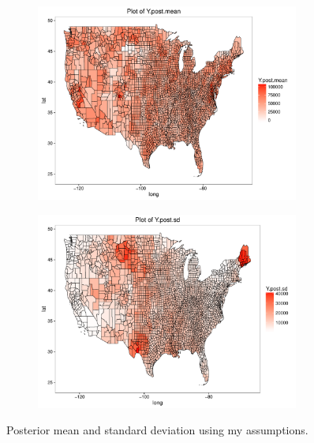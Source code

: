 \documentclass[10pt]{article}
\begin{document}
\begin{figure}
\centering
\begin{subfigure}[b]{.95\textwidth}
  \centering
  \includegraphics[width=0.95\textwidth]{post-mean.pdf}
  \label{fig:post-mean}
\end{subfigure}

\begin{subfigure}[b]{.95\textwidth}
  \centering
  \includegraphics[width=0.95\textwidth]{post-sd.pdf}
  \label{fig:post-sd}
\end{subfigure}
\caption{Posterior mean and standard deviation using my assumptions.}
\label{fig:post}
\end{figure}






%
\end{document}
